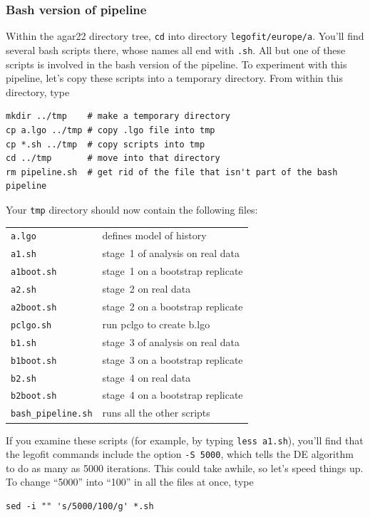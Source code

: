 \documentclass[11pt]{article}
\begin{document}
\subsubsection{Bash version of pipeline}
\label{sec.bashpipe}
Within the agar22 directory tree, \texttt{cd} into directory
\texttt{legofit/europe/a}. You'll find several bash scripts there,
whose names all end with \texttt{.sh}. All but one of these scripts is
involved in the bash version of the pipeline. To experiment with this
pipeline, let's copy these scripts into a temporary directory. From
within this directory, type
\begin{verbatim}
mkdir ../tmp    # make a temporary directory
cp a.lgo ../tmp # copy .lgo file into tmp
cp *.sh ../tmp  # copy scripts into tmp
cd ../tmp       # move into that directory
rm pipeline.sh  # get rid of the file that isn't part of the bash pipeline
\end{verbatim}
Your \texttt{tmp} directory should now contain the following files:
\begin{center}
  \begin{tabular}{ll}
\texttt{a.lgo} & defines model of history\\    
\texttt{a1.sh} & stage~1 of analysis on real data\\
\texttt{a1boot.sh} & stage~1 on a bootstrap replicate\\
\texttt{a2.sh} & stage~2 on real data\\
\texttt{a2boot.sh} & stage~2 on a bootstrap replicate\\
\texttt{pclgo.sh} & run pclgo to create b.lgo  \\
\texttt{b1.sh} & stage~3 of analysis on real data\\
\texttt{b1boot.sh} & stage~3 on a bootstrap replicate\\
\texttt{b2.sh} & stage~4 on real data\\
\texttt{b2boot.sh} & stage~4 on a bootstrap replicate\\
\verb|bash_pipeline.sh| & runs all the other scripts\\
\end{tabular}
\end{center}
If you examine these scripts (for example, by typing
\texttt{less a1.sh}), you'll find that the legofit commands include
the option \texttt{-S 5000}, which tells the DE algorithm to do as
many as 5000 iterations. This could take awhile, so let's speed things
up. To change ``5000'' into ``100'' in all the files at once, type
\begin{verbatim}
sed -i "" 's/5000/100/g' *.sh 
\end{verbatim}
\end{document}

